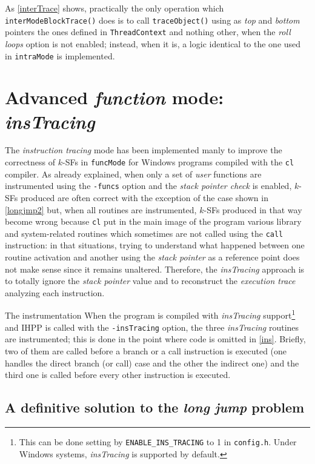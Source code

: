 \documentclass[a4paper,10pt]{report}
\begin{document}
\noindent
As \cref{interTrace} shows, practically the only operation 
which \verb|interModeBlockTrace()| does is to call \verb|traceObject()|
using as \emph{top} and \emph{bottom} pointers the ones defined in \verb|ThreadContext|
and nothing other, when the \emph{roll loops} option is not enabled;
instead, when it is, a logic identical to the one used in \verb|intraMode| is implemented.

\section{Advanced \emph{function} mode: \emph{insTracing}}

The \emph{instruction tracing} mode has been implemented manly to
improve the correctness of $k$-SFs in \verb|funcMode| for Windows 
programs compiled with the \verb|cl| compiler.
As already explained, when only a set of \emph{user} functions 
are instrumented using the \verb|-funcs| option and the \emph{stack pointer check}
is enabled, $k$-SFs produced are often correct with the exception of the case
shown in \cref{longjmp2} but, when all routines are instrumented, 
$k$-SFs produced in that way become wrong because \verb|cl| put in the main image
of the program various library and system-related routines which sometimes are not
called using the \verb|call| instruction: in that situations, trying 
to understand what happened between one routine activation and another
using the \emph{stack pointer} as a reference point does not make sense
since it remains unaltered. Therefore, the \emph{insTracing} approach is to
totally ignore the \emph{stack pointer} value and to reconstruct the 
\emph{execution trace} analyzing each instruction. 

\begin{paragraph}{The instrumentation}
When the program is compiled with \emph{insTracing}
support\footnote{This can be done setting by \texttt{ENABLE\_INS\_TRACING} to 1 in \texttt{config.h}. Under Windows systems, \emph{insTracing} is supported by default.}
and IHPP is called with the \verb|-insTracing| option, the three \emph{insTracing} 
routines are instrumented; this is done in the point where code is omitted 
in \cref{ins}. Briefly, two of them are called before a branch or a call instruction
is executed (one handles the direct branch (or call) case and the other the indirect one)
and the third one is called before every other instruction is executed.
\end{paragraph}

\subsection{A definitive solution to the \emph{long jump} problem}
\end{document}
